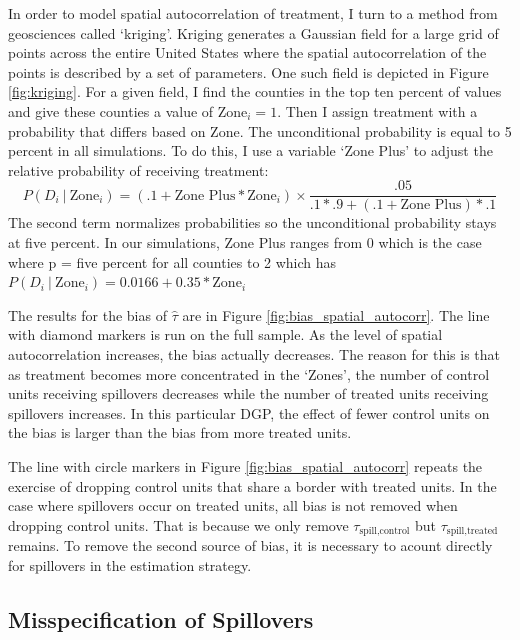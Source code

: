 \documentclass[11pt]{article}
\begin{document}
In order to model spatial autocorrelation of treatment, I turn to a method from geosciences called `kriging'. Kriging generates a Gaussian field for a large grid of points across the entire United States where the spatial autocorrelation of the points is described by a set of parameters. One such field is depicted in Figure \ref{fig:kriging}. For a given field, I find the counties in the top ten percent of values and give these counties a value of $\text{Zone}_i = 1$. Then I assign treatment with a probability that differs based on Zone. The unconditional probability is equal to 5 percent in all simulations. To do this, I use a variable `Zone Plus' to adjust the relative probability of receiving treatment: 
\begin{equation}
    \label{eq:cond_prob}
    P(D_i \ \vert \ \text{Zone}_i) = (.1 + \text{Zone Plus} * \text{Zone}_i) \times \frac{.05}{.1 * .9 + (.1 + \text{Zone Plus}) * .1}
\end{equation}
The second term normalizes probabilities so the unconditional probability stays at five percent. In our simulations, Zone Plus ranges from 0 which is the case where p = five percent for all counties to 2 which has $P(D_i \ \vert \ \text{Zone}_i) = 0.0166 + 0.35 * \text{Zone}_i$

The results for the bias of $\hat{\tau}$ are in Figure \ref{fig:bias_spatial_autocorr}. The line with diamond markers is run on the full sample. As the level of spatial autocorrelation increases, the bias actually decreases. The reason for this is that as treatment becomes more concentrated in the `Zones', the number of control units receiving spillovers decreases while the number of treated units receiving spillovers increases. In this particular DGP, the effect of fewer control units on the bias is larger than the bias from more treated units. 

The line with circle markers in Figure \ref{fig:bias_spatial_autocorr} repeats the exercise of dropping control units that share a border with treated units. In the case where spillovers occur on treated units, all bias is not removed when dropping control units. That is because we only remove $\tau_{\text{spill,control}}$ but $\tau_{\text{spill,treated}}$ remains. To remove the second source of bias, it is necessary to acount directly for spillovers in the estimation strategy.


\subsection{Misspecification of Spillovers}
\end{document}
